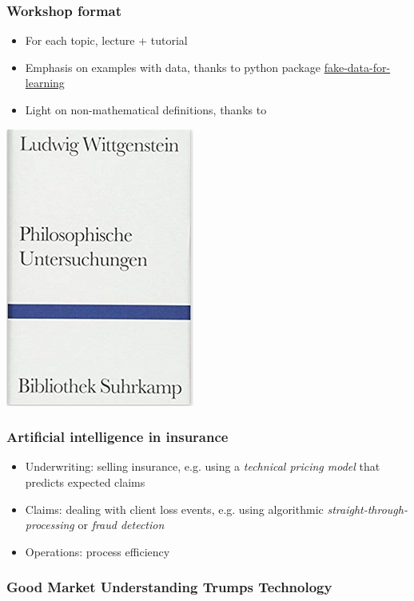 \begin{frame}
\frametitle{Workshop format}

\begin{itemize}
\item For each topic, lecture + tutorial
\item Emphasis on examples with data, thanks to python package \href{https://github.com/munichpavel/fake-data-for-learning}{fake-data-for-learning}
\item Light on non-mathematical definitions, thanks to 
\end{itemize}
\centering
\includegraphics[width=0.3\textheight]{graphics/pi_wittgenstein}
\end{frame}

\begin{frame}
  \frametitle{Artificial intelligence in insurance}

  \begin{itemize}
    \item Underwriting: selling insurance, e.g. using a \emph{technical pricing model} that predicts expected claims
    \item Claims: dealing with client loss events, e.g. using algorithmic \emph{straight-through-processing} or \emph{fraud detection}
    \item Operations: process efficiency
  \end{itemize}
\end{frame}

\begin{frame}
\frametitle{Good Market Understanding Trumps Technology}
\centering
{}
\end{frame}

